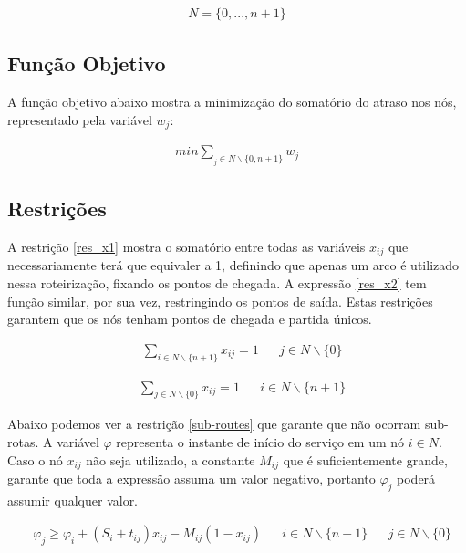 \documentclass[12pt]{article}
\begin{document}
\begin{align}
  N = \{0, ..., n+1\} \label{nodes}
\end{align}

\subsection{Função Objetivo}

A função objetivo abaixo mostra a minimização do somatório do atraso nos nós, representado pela variável $w_j$:

\begin{align}
  min        \sum_{_j\in N\backslash \{0,n+1\}} w_j \label{obj_func}
\end{align}

\subsection{Restrições}

A restrição \eqref{res_x1} mostra o somatório entre todas as variáveis $x_{ij}$ que necessariamente terá que equivaler a 1, definindo que apenas um arco é utilizado nessa roteirização, fixando os pontos de chegada. A expressão \eqref{res_x2} tem função similar, por sua vez, restringindo os pontos de saída. Estas restrições garantem que os nós tenham pontos de chegada e partida únicos.


\begin{align}
   & \sum_{i\in N\backslash \{n+1\}} x_{ij} = 1 &  & j\in N\backslash \{0\} \label{res_x1}
\end{align}

\begin{align}
   & \sum_{j\in N\backslash \{0\}} x_{ij} = 1 &  & i\in N\backslash \{n+1\} \label{res_x2}
\end{align}

Abaixo podemos ver a restrição \eqref{sub-routes} que garante que não ocorram sub-rotas. A variável $\varphi$ representa o instante de início do serviço em um nó $i \in N$. Caso o nó $x_{ij}$ não seja utilizado, a constante $M_{ij}$ que é suficientemente grande, garante que toda a expressão assuma um valor negativo, portanto $\varphi_j$ poderá assumir qualquer valor.

\begin{align}
   & \varphi_j \geq \varphi_i + (S_i + t_{ij})x_{ij} - M_{ij}(1-x_{ij}) &  & i\in N\backslash \{n+1\} &  & j\in N\backslash \{0\} \label{sub-routes}
\end{align}
\end{document}

